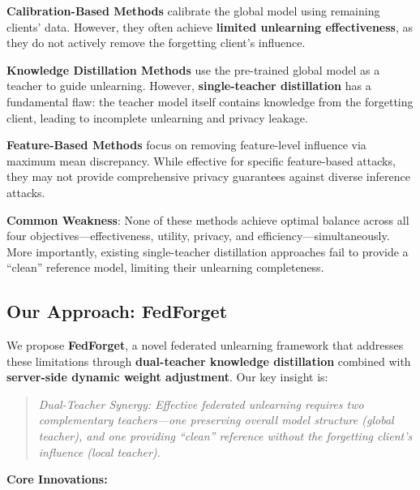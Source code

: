 \documentclass[10pt,twocolumn]{article}
\begin{document}
\textbf{Calibration-Based Methods} \cite{liu2021federaser,gao2022verifi} calibrate the global model using remaining clients' data. However, they often achieve \textbf{limited unlearning effectiveness}, as they do not actively remove the forgetting client's influence.

\textbf{Knowledge Distillation Methods} \cite{wu2023federated} use the pre-trained global model as a teacher to guide unlearning. However, \textbf{single-teacher distillation} has a fundamental flaw: the teacher model itself contains knowledge from the forgetting client, leading to incomplete unlearning and privacy leakage.

\textbf{Feature-Based Methods} \cite{ferrari2024efficient} focus on removing feature-level influence via maximum mean discrepancy. While effective for specific feature-based attacks, they may not provide comprehensive privacy guarantees against diverse inference attacks.

\textbf{Common Weakness}: None of these methods achieve optimal balance across all four objectives---effectiveness, utility, privacy, and efficiency---simultaneously. More importantly, existing single-teacher distillation approaches fail to provide a ``clean'' reference model, limiting their unlearning completeness.

\subsection{Our Approach: FedForget}

We propose \textbf{FedForget}, a novel federated unlearning framework that addresses these limitations through \textbf{dual-teacher knowledge distillation} combined with \textbf{server-side dynamic weight adjustment}. Our key insight is:

\begin{quote}
\textit{Dual-Teacher Synergy: Effective federated unlearning requires two complementary teachers---one preserving overall model structure (global teacher), and one providing ``clean'' reference without the forgetting client's influence (local teacher).}
\end{quote}

\textbf{Core Innovations:}
\end{document}
